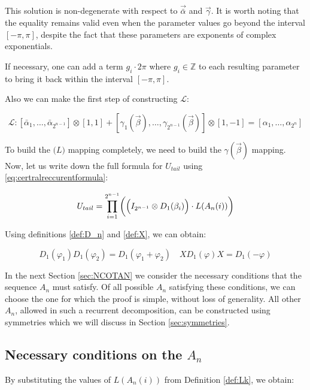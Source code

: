 \documentclass[a4paper, openany, 12pt]{article}
\theoremstyle{remark}
\theoremstyle{definition}
\newcommand{\ot}{\otimes}
\begin{document}
This solution is non-degenerate with respect to $\vec{\bar\alpha}$ and $\vec\gamma$. It is worth noting that the equality remains valid even when the parameter values go beyond the interval $[-\pi, \pi]$, despite the fact that these parameters are exponents of complex exponentials.

If necessary, one can add a term $g_i \cdot 2\pi$ where $g_i\in\mathbb{Z}$ to each resulting parameter to bring it back within the interval $[-\pi, \pi]$.

Also we can make the first step of constructing $\mathcal{L}$:

\begin{equation}
    \mathcal{L}: [\bar{\alpha}_1,\dots,\bar{\alpha}_{2^{n-1}}]\otimes[1,1] + [\gamma_1(\vec\beta),\dots,\gamma_{2^{n-1}}(\vec\beta)]\otimes[1,-1] = [\alpha_1,\dots,\alpha_{2^n}]
\end{equation}

To build the $\mathcal(L)$ mapping completely, we need to build the $\gamma(\vec\beta)$ mapping. Now, let us write down the full formula for $U_{tail}$ using \eqref{eq:certralreccurentformula}:

\begin{equation}
    U_{tail} = \prod_{i=1}^{2^{n-1}} \biggl( \Bigl(I_{2^{n-1}} \ot D_1(\beta_i)\Bigr) \cdot L(A_n(i)) \biggr)
    \label{eq:U_tail_def}
\end{equation}


Using definitions \ref{def:D_n} and \ref{def:X}, we can obtain:

\begin{equation}
    D_1(\varphi_1)D_1(\varphi_2) = D_1(\varphi_1+\varphi_2) \quad XD_1(\varphi)X = D_1(-\varphi)
    \label{eq:D_prop}
\end{equation}

In the next Section \ref{sec:NCOTAN} we consider the necessary conditions that the sequence $A_n$ must satisfy. Of all possible $A_n$ satisfying these conditions, we can choose the one for which the proof is simple, without loss of generality.  All other $A_n$,  allowed in such a recurrent decomposition, can be constructed using symmetries which we will discuss in Section \ref{sec:symmetries}.


\subsection{Necessary conditions on the $A_n$\label{sec:NCOTAN}}


By substituting the values of $L(A_n(i))$ from Definition \ref{def:Lk}, we obtain:
\end{document}
